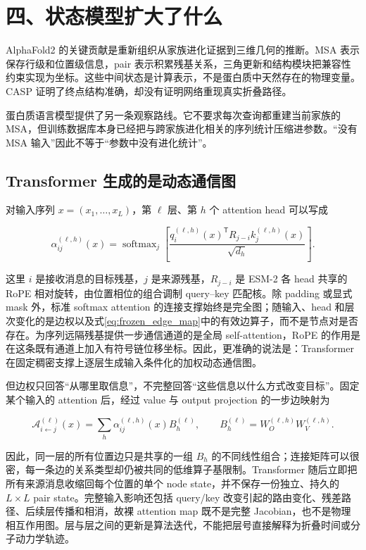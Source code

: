 \documentclass[10pt]{article}
\begin{document}
\section*{四、状态模型扩大了什么}

AlphaFold2 的关键贡献是重新组织从家族进化证据到三维几何的推断。MSA 表示保存行级和位置级信息，pair 表示积累残基关系，三角更新和结构模块把兼容性约束实现为坐标\cite{jumper2021}。这些中间状态是计算表示，不是蛋白质中天然存在的物理变量。CASP 证明了终点结构准确，却没有证明网络重现真实折叠路径。

蛋白质语言模型提供了另一条观察路线。它不要求每次查询都重建当前家族的 MSA，但训练数据库本身已经把与跨家族进化相关的序列统计压缩进参数\cite{rives2021,lin2023}。“没有 MSA 输入”因此不等于“参数中没有进化统计”。

\subsection*{Transformer 生成的是动态通信图}

对输入序列 $x=(x_1,\ldots,x_L)$，第 $\ell$ 层、第 $h$ 个 attention head 可以写成

\begin{equation}
\alpha_{ij}^{(\ell,h)}(x)
=\operatorname{softmax}_{j}
\left[
\frac{q_i^{(\ell,h)}(x)^{\mathsf T}
R_{j-i}k_j^{(\ell,h)}(x)}{\sqrt{d_h}}
\right].
\label{eq:dynamic_attention}
\end{equation}

这里 $i$ 是接收消息的目标残基，$j$ 是来源残基，$R_{j-i}$ 是 ESM-2 各 head 共享的 RoPE 相对旋转，由位置相位的组合调制 query--key 匹配核\cite{su2024,lin2023}。除 padding 或显式 mask 外，标准 softmax attention 的连接支撑始终是完全图；随输入、head 和层次变化的是边权以及式\eqref{eq:frozen_edge_map}中的有效边算子，而不是节点对是否存在。为序列远隔残基提供一步通信通道的是全局 self-attention，RoPE 的作用是在这条既有通道上加入有符号链位移坐标。因此，更准确的说法是：Transformer 在固定稠密支撑上逐层生成输入条件化的加权动态通信图。

但边权只回答“从哪里取信息”，不完整回答“这些信息以什么方式改变目标”。固定某个输入的 attention 后，经过 value 与 output projection 的一步边映射为

\begin{equation}
\mathcal A_{i\leftarrow j}^{(\ell)}(x)
=\sum_h\alpha_{ij}^{(\ell,h)}(x)B_h^{(\ell)},
\qquad
B_h^{(\ell)}=W_O^{(\ell,h)}W_V^{(\ell,h)}.
\label{eq:frozen_edge_map}
\end{equation}

因此，同一层的所有位置边只是共享的一组 $B_h$ 的不同线性组合；连接矩阵可以很密，每一条边的关系类型却仍被共同的低维算子基限制。Transformer 随后立即把所有来源消息收缩回每个位置的单个 node state，并不保存一份独立、持久的 $L\times L$ pair state。完整输入影响还包括 query/key 改变引起的路由变化、残差路径、后续层传播和相消，故裸 attention map 既不是完整 Jacobian，也不是物理相互作用图\cite{vaswani2017}。层与层之间的更新是算法迭代，不能把层号直接解释为折叠时间或分子动力学轨迹。
\end{document}
